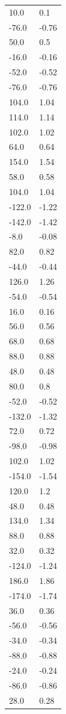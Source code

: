 \begin{longtable}{ll}
10.0 & 0.1 \\
-76.0 & -0.76 \\
50.0 & 0.5 \\
-16.0 & -0.16 \\
-52.0 & -0.52 \\
-76.0 & -0.76 \\
104.0 & 1.04 \\
114.0 & 1.14 \\
102.0 & 1.02 \\
64.0 & 0.64 \\
154.0 & 1.54 \\
58.0 & 0.58 \\
104.0 & 1.04 \\
-122.0 & -1.22 \\
-142.0 & -1.42 \\
-8.0 & -0.08 \\
82.0 & 0.82 \\
-44.0 & -0.44 \\
126.0 & 1.26 \\
-54.0 & -0.54 \\
16.0 & 0.16 \\
56.0 & 0.56 \\
68.0 & 0.68 \\
88.0 & 0.88 \\
48.0 & 0.48 \\
80.0 & 0.8 \\
-52.0 & -0.52 \\
-132.0 & -1.32 \\
72.0 & 0.72 \\
-98.0 & -0.98 \\
102.0 & 1.02 \\
-154.0 & -1.54 \\
120.0 & 1.2 \\
48.0 & 0.48 \\
134.0 & 1.34 \\
88.0 & 0.88 \\
32.0 & 0.32 \\
-124.0 & -1.24 \\
186.0 & 1.86 \\
-174.0 & -1.74 \\
36.0 & 0.36 \\
-56.0 & -0.56 \\
-34.0 & -0.34 \\
-88.0 & -0.88 \\
-24.0 & -0.24 \\
-86.0 & -0.86 \\
28.0 & 0.28 \\

\end{longtable}

